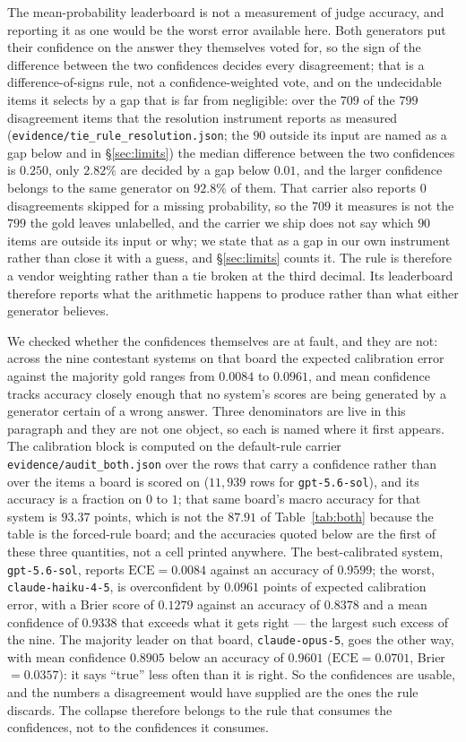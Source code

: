 \documentclass{article}
\newcommand{\ids}[1]{\texttt{\small #1}} %
\begin{document}
The mean-probability leaderboard is not a measurement of judge accuracy, and reporting it as one would be the worst error available here. Both generators put their confidence on the answer they themselves voted for, so the sign of the difference between the two confidences decides every disagreement; that is a difference-of-signs rule, not a confidence-weighted vote, and on the undecidable items it selects by a gap that is far from negligible: over the $709$ of the $799$ disagreement items that the resolution instrument reports as measured (\ids{evidence/tie\_rule\_resolution.json}; the $90$ outside its input are named as a gap below and in \S\ref{sec:limits}) the median difference between the two confidences is $0.250$, only $2.82\%$ are decided by a gap below $0.01$, and the larger confidence belongs to the same generator on $92.8\%$ of them. That carrier also reports $0$ disagreements skipped for a missing probability, so the $709$ it measures is not the $799$ the gold leaves unlabelled, and the carrier we ship does not say which $90$ items are outside its input or why; we state that as a gap in our own instrument rather than close it with a guess, and \S\ref{sec:limits} counts it. The rule is therefore a vendor weighting rather than a tie broken at the third decimal. Its leaderboard therefore reports what the arithmetic happens to produce rather than what either generator believes.

We checked whether the confidences themselves are at fault, and they are not: across the nine contestant systems on that board the expected calibration error against the majority gold ranges from $0.0084$ to $0.0961$, and mean confidence tracks accuracy closely enough that no system's scores are being generated by a generator certain of a wrong answer. Three denominators are live in this paragraph and they are not one object, so each is named where it first appears. The calibration block is computed on the default-rule carrier \ids{evidence/audit\_both.json} over the rows that carry a confidence rather than over the items a board is scored on ($11{,}939$ rows for \ids{gpt-5.6-sol}), and its accuracy is a fraction on $0$ to $1$; that same board's macro accuracy for that system is $93.37$ points, which is not the $87.91$ of Table~\ref{tab:both} because the table is the forced-rule board; and the accuracies quoted below are the first of these three quantities, not a cell printed anywhere. The best-calibrated system, \ids{gpt-5.6-sol}, reports $\mathrm{ECE} = 0.0084$ against an accuracy of $0.9599$; the worst, \ids{claude-haiku-4-5}, is overconfident by $0.0961$ points of expected calibration error, with a Brier score of $0.1279$ against an accuracy of $0.8378$ and a mean confidence of $0.9338$ that exceeds what it gets right --- the largest such excess of the nine. The majority leader on that board, \ids{claude-opus-5}, goes the other way, with mean confidence $0.8905$ below an accuracy of $0.9601$ ($\mathrm{ECE} = 0.0701$, Brier $= 0.0357$): it says ``true'' less often than it is right. So the confidences are usable, and the numbers a disagreement would have supplied are the ones the rule discards. The collapse therefore belongs to the rule that consumes the confidences, not to the confidences it consumes.
\end{document}
